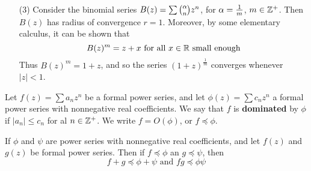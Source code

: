 \begin{example}
\begin{enumerate}
        \item[(3)] Consider the binomial series $B(z)=\sum{{\alpha\choose n}z^n}$,
            for $\alpha=\frac{1}{m}$, $m \in \mathbb{Z}^+$. Then $B(z)$ has radius of
            convergence $r=1$. Moreover, by some elementary calculus, it can be
            shown that
            \begin{equation*}
                B(z)^m=z+x \text{ for all } x \in \mathbb{R} \text{ small enough}
            \end{equation*}
            Thus $B(z)^m=1+z$, and so the series $(1+z)^\frac{1}{m}$ converges
            whenever $|z|<1$.
    \end{enumerate}
\end{example}

\begin{definition}
    Let $f(z)=\sum{a_nz^n}$ be a formal power series, and let
    $\phi(z)=\sum{c_nz^n}$ a formal power series with nonnegative real
    coefficients. We say that  $f$ is  \textbf{dominated} by $\phi$ if $|a_n|
    \leq c_n$ for al  $n \in \mathbb{Z}^+$. We write  $f=O(\phi)$, or $f \preceq \phi$.
\end{definition}

\begin{lemma}\label{lemma_2.3.3}
    If $\phi$ and  $\psi$ are power series with nonnegative real coefficients,
    and let $f(z)$ and $g(z)$ be formal power series. Then if $f \preceq \phi$
    an $g \preceq \psi$, then
    \begin{equation*}
        f+g \preceq \phi+\psi \text{ and } fg \preceq \phi\psi
    \end{equation*}
\end{lemma}

